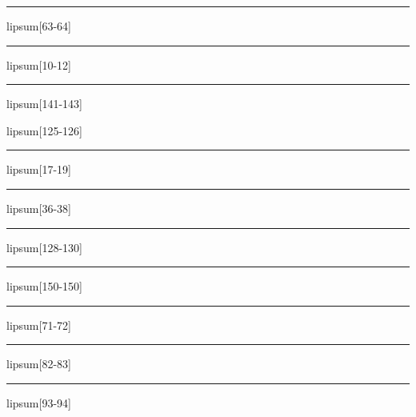 \documentclass[11pt,a4paper]{article}
\begin{document}
\begin{simplewrap}
  \textcolor{magenta!35}{\rule{3.7cm}{3.2cm}}
\end{simplewrap}
lipsum[63-64]

\begin{simplewrap}
  \textcolor{violet!39}{\rule{4.5cm}{9.9cm}}
\end{simplewrap}
lipsum[10-12]

\begin{simplewrap}
  \textcolor{teal!18}{\rule{3.1cm}{8.3cm}}
\end{simplewrap}
lipsum[141-143]

lipsum[125-126]

\begin{simplewrap}
  \textcolor{red!13}{\rule{5.6cm}{2.7cm}}
\end{simplewrap}
lipsum[17-19]

\begin{simplewrap}
  \textcolor{olive!33}{\rule{5.0cm}{9.1cm}}
\end{simplewrap}
lipsum[36-38]

\begin{simplewrap}
  \textcolor{cyan!17}{\rule{4.6cm}{8.6cm}}
\end{simplewrap}
lipsum[128-130]

\begin{simplewrap}
  \textcolor{magenta!48}{\rule{3.4cm}{8.5cm}}
\end{simplewrap}
lipsum[150-150]

\begin{simplewrap}
  \textcolor{magenta!37}{\rule{3.7cm}{2.9cm}}
\end{simplewrap}
lipsum[71-72]

\begin{simplewrap}
  \textcolor{teal!47}{\rule{3.2cm}{6.3cm}}
\end{simplewrap}
lipsum[82-83]

\begin{simplewrap}
  \textcolor{red!53}{\rule{3.7cm}{4.2cm}}
\end{simplewrap}
lipsum[93-94]
\end{document}
